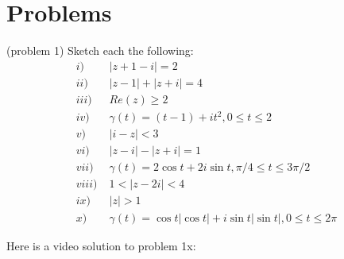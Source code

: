 \documentclass[handout]{ximera}
\begin{document}
\section{Problems}
\begin{problem}(problem 1)
Sketch each the following:\\
\begin{align*}
i) & \; |z+1-i| = 2 \\
ii) &  \; |z-1| + |z+i| = 4 \\
iii) & \;  Re(z) \geq 2 \\
iv) &  \; \gamma(t) = (t-1) + it^2, 0\leq t \leq 2 \\
v) &  \; |i- z| < 3 \\
vi) &  \; |z-i| - |z+i| = 1 \\
vii) & \;  \gamma(t) = 2\cos t + 2i\sin t , \pi/4 \leq t \leq 3\pi/2 \\
viii) &  \; 1 < |z -2i| < 4 \\
ix) & \;  |z| > 1 \\
x) &  \; \gamma(t) = \cos t |\cos t| + i\sin t |\sin t|, 0 \leq t \leq 2\pi
\end{align*}
\end{problem}

Here is a video solution to problem 1x:\\
\begin{foldable}
\end{foldable}
\end{document}
